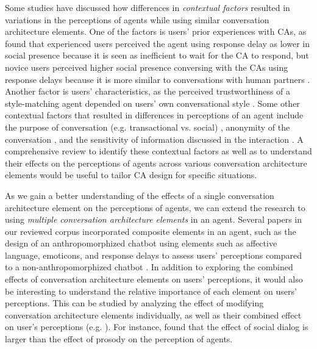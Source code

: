 Some studies have discussed how differences in \textit{contextual factors} resulted in variations in the perceptions of agents while using similar conversation architecture elements. One of the factors is users' prior experiences with CAs, as \citet{gnewuch2018faster}\cmt{[19]} found that experienced users perceived the agent using response delay as lower in social presence because it is seen as inefficient to wait for the CA to respond, but novice users perceived higher social presence conversing with the CAs using response delays because it is more similar to conversations with human partners \cite{gnewuch2018faster}\cmt{[19]}. Another factor is users' characteristics, as the perceived trustworthiness of a style-matching agent depended on users' own conversational style \cite{hoegen2019end}\cmt{[31]}. Some other contextual factors that resulted in differences in perceptions of an agent include the purpose of conversation (e.g. transactional vs. social) \cite{jeong2019exploring}\cmt{[10]}, anonymity of the conversation \cite{lee2020hear}\cmt{[23]}, and the sensitivity of information discussed in the interaction \cite{cox2022does}\cmt{[27]}. A comprehensive review to identify these contextual factors as well as to understand their effects on the perceptions of agents across various conversation architecture elements would be useful to tailor CA design for specific situations. 

As we gain a better understanding of the effects of a single conversation architecture element on the perceptions of agents, we can extend the research to using \textit{multiple conversation architecture elements} in an agent. Several papers in our reviewed corpus incorporated composite elements in an agent, such as the design of an anthropomorphized chatbot using elements such as affective language, emoticons, and response delays to assess users' perceptions compared to a non-anthropomorphized chatbot \cite{seeger2021chatbots}\cmt{[35]}. In addition to exploring the combined effects of conversation architecture elements on users' perceptions, it would also be interesting to understand the relative importance of each element on users' perceptions. This can be studied by analyzing the effect of modifying conversation architecture elements individually, as well as their combined effect on user's perceptions (e.g. \cite{habler2019effects, lubold2016effects, zhu2022effects}\cmt{[63][86][26]}). For instance, \citet{habler2019effects}\cmt{[63]} found that the effect of social dialog is larger than the effect of prosody on the perception of agents. 

